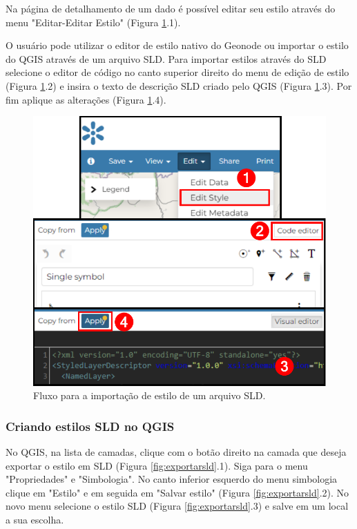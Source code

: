 \documentclass[12pt]{article}
\begin{document}
Na página de detalhamento de um dado é possível editar seu estilo através do
menu "Editar-Editar Estilo" (Figura \ref{fig:estilocodigo}.1).

O usuário pode utilizar o editor de estilo nativo do Geonode ou importar o
estilo do QGIS através de um arquivo SLD. Para importar estilos através do SLD
selecione o editor de código no canto superior direito do menu de edição de
estilo (Figura \ref{fig:estilocodigo}.2) e insira o texto de descrição SLD
criado pelo QGIS (Figura \ref{fig:estilocodigo}.3). Por fim aplique as
alterações (Figura \ref{fig:estilocodigo}.4).

\begin{figure}[h]
  \centering
  \includegraphics[width=\textwidth, keepaspectratio]{img/estilocodigo.pdf}
  \caption{Fluxo para a importação de estilo de um arquivo SLD.}
  \label{fig:estilocodigo}
\end{figure}

\subsubsection{Criando estilos SLD no QGIS}

No QGIS, na lista de camadas, clique com o botão direito na camada que deseja
exportar o estilo em SLD (Figura \ref{fig:exportarsld}.1). Siga para o menu
"Propriedades" e "Simbologia". No canto inferior esquerdo do menu simbologia
clique em "Estilo" e em seguida em "Salvar estilo" (Figura
\ref{fig:exportarsld}.2). No novo menu selecione o estilo SLD (Figura
\ref{fig:exportarsld}.3) e salve em um local a sua escolha.
\end{document}
